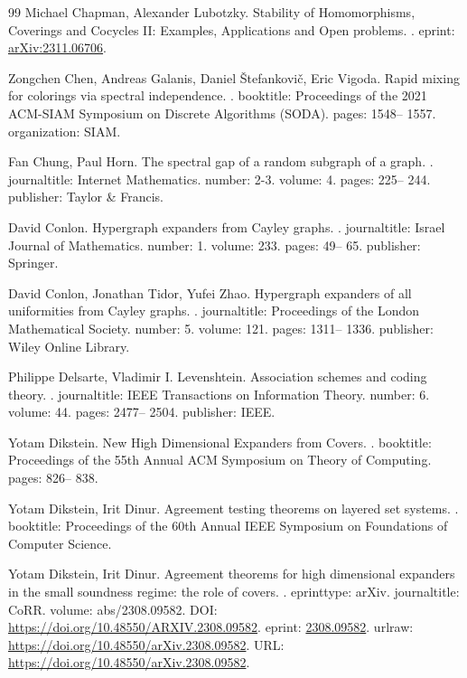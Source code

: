 \begin{thebibliography}{99}
Michael Chapman, Alexander Lubotzky.
\newblock Stability of Homomorphisms, Coverings and Cocycles II: Examples, Applications and Open problems.
.
\newblock eprint: \url{arXiv:2311.06706}.

Zongchen Chen, Andreas Galanis, Daniel Štefankovič, Eric Vigoda.
\newblock Rapid mixing for colorings via spectral independence.
.
\newblock booktitle: Proceedings of the 2021 ACM-SIAM Symposium on Discrete Algorithms (SODA).
\newblock pages: 1548-- 1557.
\newblock organization: SIAM.

Fan Chung, Paul Horn.
\newblock The spectral gap of a random subgraph of a graph.
.
\newblock journaltitle: Internet Mathematics.
\newblock number: 2-3.
\newblock volume: 4.
\newblock pages: 225-- 244.
\newblock publisher: Taylor \& Francis.

David Conlon.
\newblock Hypergraph expanders from Cayley graphs.
.
\newblock journaltitle: Israel Journal of Mathematics.
\newblock number: 1.
\newblock volume: 233.
\newblock pages: 49-- 65.
\newblock publisher: Springer.

David Conlon, Jonathan Tidor, Yufei Zhao.
\newblock Hypergraph expanders of all uniformities from Cayley graphs.
.
\newblock journaltitle: Proceedings of the London Mathematical Society.
\newblock number: 5.
\newblock volume: 121.
\newblock pages: 1311-- 1336.
\newblock publisher: Wiley Online Library.

Philippe Delsarte, Vladimir I. Levenshtein.
\newblock Association schemes and coding theory.
.
\newblock journaltitle: IEEE Transactions on Information Theory.
\newblock number: 6.
\newblock volume: 44.
\newblock pages: 2477-- 2504.
\newblock publisher: IEEE.

Yotam Dikstein.
\newblock New High Dimensional Expanders from Covers.
.
\newblock booktitle: Proceedings of the 55th Annual ACM Symposium on Theory of Computing.
\newblock pages: 826-- 838.

Yotam Dikstein, Irit Dinur.
\newblock Agreement testing theorems on layered set systems.
.
\newblock booktitle: Proceedings of the 60th Annual IEEE Symposium on Foundations of Computer Science.

Yotam Dikstein, Irit Dinur.
\newblock Agreement theorems for high dimensional expanders in the small soundness regime: the role of covers.
.
\newblock eprinttype: arXiv.
\newblock journaltitle: CoRR.
\newblock volume: abs/2308.09582.
\newblock DOI: \url{https://doi.org/10.48550/ARXIV.2308.09582}.
\newblock eprint: \url{2308.09582}.
\newblock urlraw: \url{https://doi.org/10.48550/arXiv.2308.09582}.
\newblock URL: \url{https://doi.org/10.48550/arXiv.2308.09582}.


\end{thebibliography}
